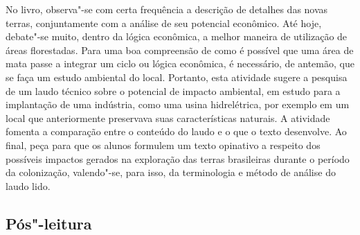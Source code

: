 \documentclass[12pt]{extarticle}
\begin{document}
No livro, observa"-se com certa frequência a descrição de detalhes das
novas terras, conjuntamente com a análise de seu potencial econômico.
Até hoje, debate"-se muito, dentro da lógica econômica, a melhor maneira
de utilização de áreas florestadas. Para uma boa compreensão de como é
possível que uma área de mata passe a integrar um ciclo ou lógica
econômica, é necessário, de antemão, que se faça um estudo ambiental do
local. Portanto, esta atividade sugere a pesquisa de um laudo técnico
sobre o potencial de impacto ambiental, em estudo para a implantação de
uma indústria, como uma usina hidrelétrica, por exemplo em um local que
anteriormente preservava suas características naturais. A atividade
fomenta a comparação entre o conteúdo do laudo e o que o texto
desenvolve. Ao final, peça para que os alunos formulem um texto
opinativo a respeito dos possíveis impactos gerados na exploração das
terras brasileiras durante o período da colonização, valendo"-se, para
isso, da terminologia e método de análise do laudo lido.


\subsection{Pós"-leitura}


\end{document}
